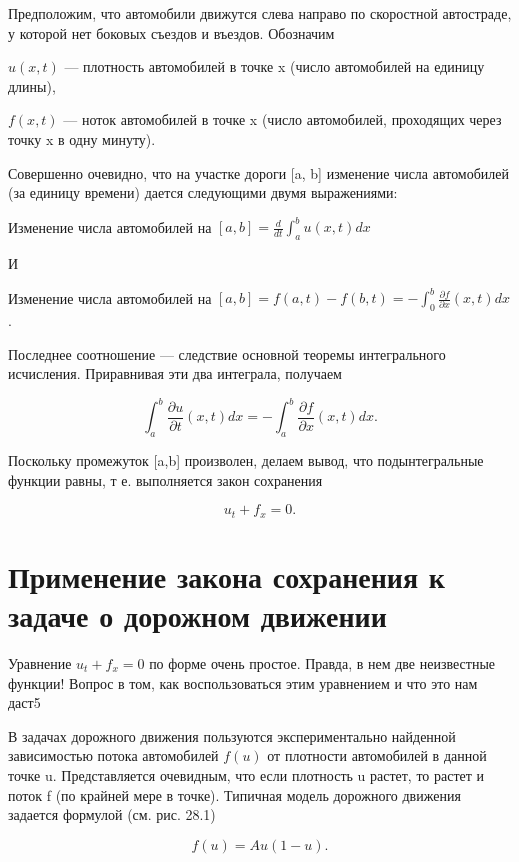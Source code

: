 \documentclass[
  ukrainian,
]{article}
\begin{document}
Предположим, что автомобили движутся слева направо по скоростной
автостраде, у которой нет боковых съездов и въездов. Обозначим

\(u(x, t)\) --- плотность автомобилей в точке x (число автомобилей на
единицу длины),

\(f(x, t)\) --- ноток автомобилей в точке x (число автомобилей,
проходящих через точку x в одну минуту).

Совершенно очевидно, что на участке дороги {[}a, b{]} изменение числа
автомобилей (за единицу времени) дается следующими двумя выражениями:

Изменение числа автомобилей на
\([a, b] = \frac{d}{dt} \int_a^b u(x, t) dx\)

И

Изменение числа автомобилей на
\([a,b] = f(a,t) - f(b,t) = -\int_{0}^{b} \frac{\partial f}{\partial x}(x,t)dx\)
.

Последнее соотношение --- следствие основной теоремы интегрального
исчисления. Приравнивая эти два интеграла, получаем

\[
\int_{a}^{b} \frac{\partial u}{\partial t}(x, t) dx = -\int_{a}^{b} \frac{\partial f}{\partial x}(x, t) dx.
\]

Поскольку промежуток {[}a,b{]} произволен, делаем вывод, что
подынтегральные функции равны, т е. выполняется закон сохранения

\[
u_t + f_x = 0.
\]

\section{Применение закона сохранения к задаче о дорожном
движении}\label{ux43fux440ux438ux43cux435ux43dux435ux43dux438ux435-ux437ux430ux43aux43eux43dux430-ux441ux43eux445ux440ux430ux43dux435ux43dux438ux44f-ux43a-ux437ux430ux434ux430ux447ux435-ux43e-ux434ux43eux440ux43eux436ux43dux43eux43c-ux434ux432ux438ux436ux435ux43dux438ux438}

Уравнение \(u_t + f_x = 0\) по форме очень простое. Правда, в нем две
неизвестные функции! Вопрос в том, как воспользоваться этим уравнением и
что это нам даст5

В задачах дорожного движения пользуются экспериментально найденной
зависимостью потока автомобилей \(f(u)\) от плотности автомобилей в
данной точке u. Представляется очевидным, что если плотность u растет,
то растет и поток f (по крайней мере в точке). Типичная модель дорожного
движения задается формулой (см. рис. 28.1)

\[
f(u) = Au (1-u).
\]
\end{document}
